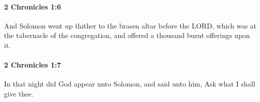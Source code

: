 		\paragraph{2 Chronicles 1:6} %
			\label{2CHRONICLES-1-6}

			And Solomon went up thither to the brasen altar before the LORD, which was at the tabernacle of the congregation, and offered a thousand burnt offerings upon it.


		\paragraph{2 Chronicles 1:7} %
			\label{2CHRONICLES-1-7}

			In that night did God appear unto Solomon, and said unto him, Ask what I shall give thee.


